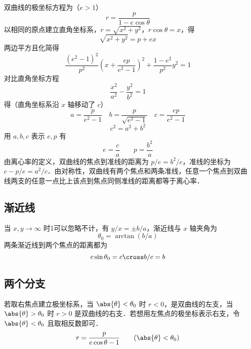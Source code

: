 双曲线的极坐标方程为（$e>1$）
\begin{equation}
r = \frac{p}{{1 - e\cos \theta }}
\end{equation}
以相同的原点建立直角坐标系，$r = \sqrt {{x^2} + {y^2}}$，$r\cos \theta  = x$，得
\begin{equation}
\sqrt {{x^2} + {y^2}}  = p + ex
\end{equation}
两边平方且化简得
\begin{equation}
\frac{{{{({e^2} - 1)}^2}}}{{{p^2}}}{\left( {x + \frac{{ep}}{{{e^2} - 1}}} \right)^2} + \frac{{1 - {e^2}}}{{{p^2}}}{y^2} = 1
\end{equation}
对比直角坐标方程
\begin{equation}
\frac{{{x^2}}}{{{a^2}}} - \frac{{{y^2}}}{{{b^2}}} = 1
\end{equation}
得（直角坐标系沿 $x$ 轴移动了 $c$）
\begin{equation}
a = \frac{p}{{{e^2} - 1}} \quad  b = \frac{p}{{\sqrt {{e^2} - 1} }} \quad c = \frac{{ep}}{{{e^2} - 1}}
\end{equation}
\begin{equation}
c^2 = a^2 + b^2
\end{equation}
用 $a, b, c$ 表示 $e,p$ 有
\begin{equation}
e = \frac{c}{a} \qquad p = \frac{{{b^2}}}{a}
\end{equation}
由离心率的定义，双曲线的焦点到准线的距离为 $p/e=b^2/c$，准线的坐标为 $c-p/e = a^2/c$．由对称性，双曲线有两个焦点和两条准线，任意一个焦点到双曲线两支的任意一点比上该点到焦点同侧准线的距离都等于离心率．


\subsection{渐近线}
当 $x,y\to \infty$ 时1可以忽略不计，有 $y/x = \pm b/a$，渐近线与 $x$ 轴夹角为
\begin{equation}
\theta_0 = \arctan(b/a)
\end{equation}
两条渐近线到两个焦点的距离都为
\begin{equation}
c\sin\theta_0 = c\cross b/c = b
\end{equation}

\subsection{两个分支}
若取右焦点建立极坐标系，当 $\abs{\theta}<\theta_0$ 时 $r<0$，是双曲线的左支，当 $\abs{\theta}>\theta_0$ 时 $r>0$ 是双曲线的右支．若想用左焦点的极坐标表示右支，令 $\abs{\theta}<\theta_0$ 且取相反数即可．
\begin{equation}
r = \frac{p}{{e\cos \theta -1}} \qquad (\abs{\theta}<\theta_0)
\end{equation}










